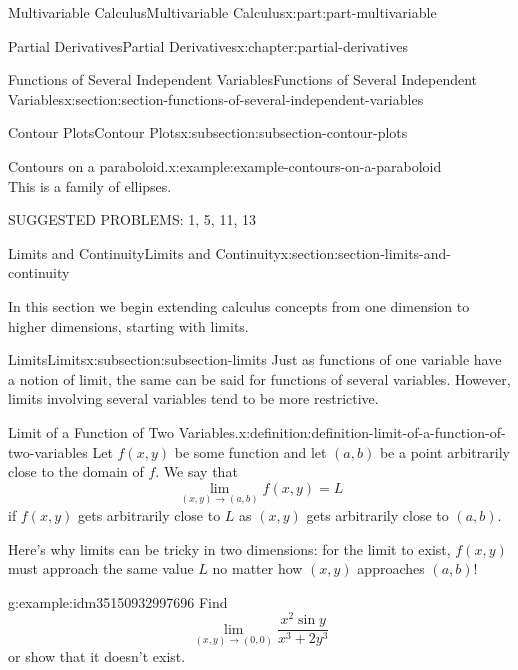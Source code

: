 \documentclass[twoside,10pt,]{tufte-book}
\numberwithin{equation}{part}
\begin{document}
\begin{partptx}{Multivariable Calculus}{}{Multivariable Calculus}{}{}{x:part:part-multivariable}
\begin{chapterptx}{Partial Derivatives}{}{Partial Derivatives}{}{}{x:chapter:partial-derivatives}
\begin{sectionptx}{Functions of Several Independent Variables}{}{Functions of Several Independent Variables}{}{}{x:section:section-functions-of-several-independent-variables}
\begin{subsectionptx}{Contour Plots}{}{Contour Plots}{}{}{x:subsection:subsection-contour-plots}
\begin{example}{Contours on a paraboloid.}{x:example:example-contours-on-a-paraboloid}
\begin{equation*}
\end{equation*}
This is a family of ellipses.%
\end{example}
\end{subsectionptx}
\begin{conclusion}{}%
SUGGESTED PROBLEMS: 1, 5, 11, 13%
\end{conclusion}%
\end{sectionptx}
%
%
\typeout{************************************************}
\typeout{************************************************}
%
\begin{sectionptx}{Limits and Continuity}{}{Limits and Continuity}{}{}{x:section:section-limits-and-continuity}
\begin{introduction}{}%
In this section we begin extending calculus concepts from one dimension to higher dimensions, starting with limits.%
\end{introduction}%
%
%
\typeout{************************************************}
\typeout{************************************************}
%
\begin{subsectionptx}{Limits}{}{Limits}{}{}{x:subsection:subsection-limits}
Just as functions of one variable have a notion of limit, the same can be said for functions of several variables. However, limits involving several variables tend to be more restrictive.%
\begin{definition}{Limit of a Function of Two Variables.}{x:definition:definition-limit-of-a-function-of-two-variables}%
%
Let \(f(x,y)\) be some function and let \((a,b)\) be a point arbitrarily close to the domain of \(f\). We say that%
\begin{equation*}
\lim_{(x,y)\to(a,b)}f(x,y) = L
\end{equation*}
if \(f(x,y)\) gets arbitrarily close to \(L\) as \((x,y)\) gets arbitrarily close to \((a,b)\).%
\end{definition}
Here's why limits can be tricky in two dimensions: for the limit to exist, \(f(x,y)\) must approach the same value \(L\) no matter how \((x,y)\) approaches \((a,b)\)!%
\begin{example}{}{g:example:idm35150932997696}%
Find%
\begin{equation*}
\lim_{(x,y)\to(0,0)}\frac{x^{2}\sin y}{x^{3}+2y^{3}}
\end{equation*}
or show that it doesn't exist.%
\par\smallskip%

\end{example}
\end{subsectionptx}
\end{sectionptx}
\end{chapterptx}
\end{partptx}
\end{document}
